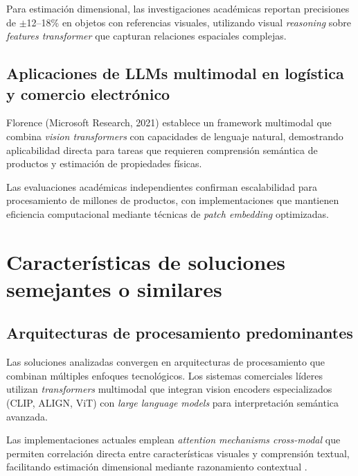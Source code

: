 Para estimación dimensional, las investigaciones académicas reportan precisiones de $\pm$12--18\% en objetos con referencias visuales, utilizando visual \textit{reasoning} sobre \textit{features transformer} que capturan relaciones espaciales complejas.

\subsection{Aplicaciones de LLMs multimodal en logística y comercio electrónico}

Florence (Microsoft Research, 2021) establece un framework multimodal que combina \textit{vision transformers} con capacidades de lenguaje natural, demostrando aplicabilidad directa para tareas que requieren comprensión semántica de productos y estimación de propiedades físicas.

Las evaluaciones académicas independientes confirman escalabilidad para procesamiento de millones de productos, con implementaciones que mantienen eficiencia computacional mediante técnicas de \textit{patch embedding} optimizadas.

\section{Características de soluciones semejantes o similares}

\subsection{Arquitecturas de procesamiento predominantes}

Las soluciones analizadas convergen en arquitecturas de procesamiento que combinan múltiples enfoques tecnológicos. Los sistemas comerciales líderes utilizan \textit{transformers} multimodal que integran vision encoders especializados (CLIP, ALIGN, ViT) con \textit{large language models} para interpretación semántica avanzada.

Las implementaciones actuales emplean \textit{attention mechanisms cross-modal} que permiten correlación directa entre características visuales y comprensión textual, facilitando estimación dimensional mediante razonamiento contextual \cite{Dosovitskiy2020}.

